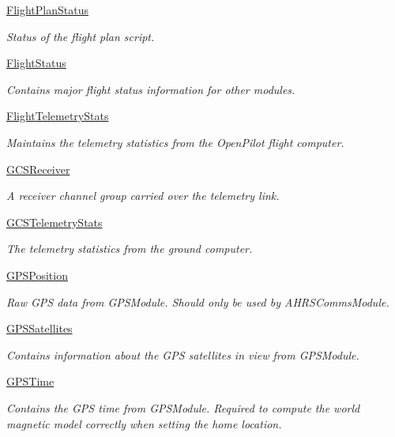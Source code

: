 \begin{DoxyCompactItemize}
\hyperlink{group___flight_plan_status}{\-Flight\-Plan\-Status}
\begin{DoxyCompactList}\small\item\em \-Status of the flight plan script. \end{DoxyCompactList}\item 
\hyperlink{group___flight_status}{\-Flight\-Status}
\begin{DoxyCompactList}\small\item\em \-Contains major flight status information for other modules. \end{DoxyCompactList}\item 
\hyperlink{group___flight_telemetry_stats}{\-Flight\-Telemetry\-Stats}
\begin{DoxyCompactList}\small\item\em \-Maintains the telemetry statistics from the \-Open\-Pilot flight computer. \end{DoxyCompactList}\item 
\hyperlink{group___g_c_s_receiver}{\-G\-C\-S\-Receiver}
\begin{DoxyCompactList}\small\item\em \-A receiver channel group carried over the telemetry link. \end{DoxyCompactList}\item 
\hyperlink{group___g_c_s_telemetry_stats}{\-G\-C\-S\-Telemetry\-Stats}
\begin{DoxyCompactList}\small\item\em \-The telemetry statistics from the ground computer. \end{DoxyCompactList}\item 
\hyperlink{group___g_p_s_position}{\-G\-P\-S\-Position}
\begin{DoxyCompactList}\small\item\em \-Raw \-G\-P\-S data from \-G\-P\-S\-Module. \-Should only be used by \-A\-H\-R\-S\-Comms\-Module. \end{DoxyCompactList}\item 
\hyperlink{group___g_p_s_satellites}{\-G\-P\-S\-Satellites}
\begin{DoxyCompactList}\small\item\em \-Contains information about the \-G\-P\-S satellites in view from \-G\-P\-S\-Module. \end{DoxyCompactList}\item 
\hyperlink{group___g_p_s_time}{\-G\-P\-S\-Time}
\begin{DoxyCompactList}\small\item\em \-Contains the \-G\-P\-S time from \-G\-P\-S\-Module. \-Required to compute the world magnetic model correctly when setting the home location. \end{DoxyCompactList}\item 

\end{DoxyCompactItemize}
